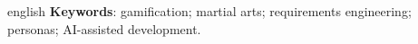 \begin{resumo}[Abstract]
\begin{otherlanguage*}{english}
\vspace{\onelineskip}
\noindent\textbf{Keywords}: gamification; martial arts; requirements engineering; personas; AI-assisted development.
\end{otherlanguage*}
\end{resumo}